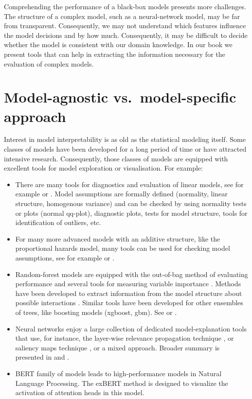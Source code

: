 \documentclass[]{krantz}
\providecommand{\tightlist}{%
  \setlength{\itemsep}{0pt}\setlength{\parskip}{0pt}}
\begin{document}
Comprehending the performance of a black-box models presents more challenges. The structure of a complex model, such as a neural-network model, may be far from transparent. Consequently, we may not understand which features influence the model decisions and by how much. Consequently, it may be difficult to decide whether the model is consistent with our domain knowledge. In our book we present tools that can help in extracting the information necessary for the evaluation of complex models.

\hypertarget{model-agnostic-vs.model-specific-approach}{%
\section{Model-agnostic vs.~model-specific approach}\label{model-agnostic-vs.model-specific-approach}}

Interest in model interpretability is as old as the statistical modeling itself.
Some classes of models have been developed for a long period of time or have attracted intensive research. Consequently, those classes of models are equipped with excellent tools for model exploration or visualisation. For example:

\begin{itemize}
\tightlist
\item
  There are many tools for diagnostics and evaluation of linear models, see for example \citep{Galecki2013} or \citep{Faraway02practicalregression}. Model assumptions are formally defined (normality, linear structure, homogenous variance) and can be checked by using normality tests or plots (normal qq-plot), diagnostic plots, tests for model structure, tools for identification of outliers, etc.
\item
  For many more advanced models with an additive structure, like the proportional hazards model, many tools can be used for checking model assumptions, see for example \citep{rms} or \citep{sheather2009modern}.
\item
  Random-forest models are equipped with the out-of-bag method of evaluating performance and several tools for measuring variable importance \citep{R-randomForest}. Methods have been developed to extract information from the model structure about possible interactions \citep{randomForestExplainer}. Similar tools have been developed for other ensembles of trees, like boosting models (xgboost, gbm). See \citep{xgboostExplainer} or \citep{EIXkarbowiak}.
\item
  Neural networks enjoy a large collection of dedicated model-explanation tools that use, for instance, the layer-wise relevance propagation technique \citep{BachLWRP}, or saliency maps technique \citep{SaliencyMaps}, or a mixed approach. Broader summary is presented in \citep{samek2017explainable} and \citep{alber2018innvestigate}.
\item
  BERT family of models leads to high-performance models in Natural Language Processing. The exBERT method \citep{hoover2019exbert} is designed to visualize the activation of attention heads in this model.
\end{itemize}
\end{document}

